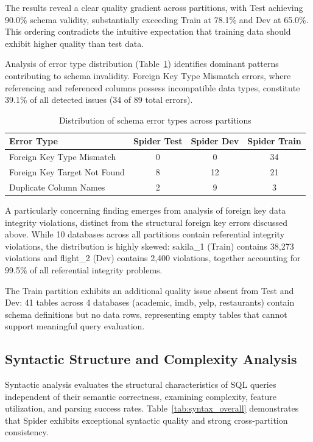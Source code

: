 \documentclass[]{einformatica}
\begin{document}
The results reveal a clear quality gradient across partitions, with Test achieving 90.0\% schema validity, substantially exceeding Train at 78.1\% and Dev at 65.0\%. This ordering contradicts the intuitive expectation that training data should exhibit higher quality than test data.

Analysis of error type distribution (Table~\ref{tab:schema_errors}) identifies dominant patterns contributing to schema invalidity. Foreign Key Type Mismatch errors, where referencing and referenced columns possess incompatible data types, constitute 39.1\% of all detected issues (34 of 89 total errors).

\begin{table}[ht]
    \caption{Distribution of schema error types across partitions}
    \label{tab:schema_errors}
    \centering
    \footnotesize
    \begin{tabular}{lccc}
        \toprule
        \textbf{Error Type} & \textbf{Spider Test} & \textbf{Spider Dev} & \textbf{Spider Train} \\
        \midrule
        Foreign Key Type Mismatch & 0 & 0 & 34 \\
        Foreign Key Target Not Found & 8 & 12 & 21 \\
        Duplicate Column Names & 2 & 9 & 3 \\
        \bottomrule
    \end{tabular}
\end{table}

A particularly concerning finding emerges from analysis of foreign key data integrity violations, distinct from the structural foreign key errors discussed above. While 10 databases across all partitions contain referential integrity violations, the distribution is highly skewed: sakila\_1 (Train) contains 38,273 violations and flight\_2 (Dev) contains 2,400 violations, together accounting for 99.5\% of all referential integrity problems.

The Train partition exhibits an additional quality issue absent from Test and Dev: 41 tables across 4 databases (academic, imdb, yelp, restaurants) contain schema definitions but no data rows, representing empty tables that cannot support meaningful query evaluation.

\subsection{Syntactic Structure and Complexity Analysis}

Syntactic analysis evaluates the structural characteristics of SQL queries independent of their semantic correctness, examining complexity, feature utilization, and parsing success rates. Table~\ref{tab:syntax_overall} demonstrates that Spider exhibits exceptional syntactic quality and strong cross-partition consistency.
\end{document}

